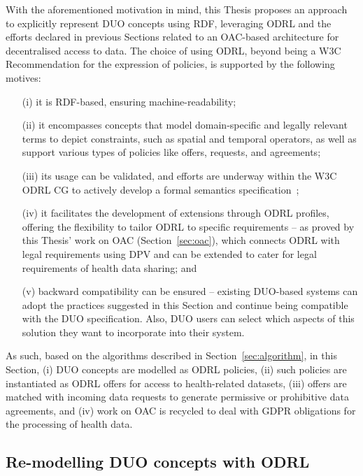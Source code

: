 With the aforementioned motivation in mind, this Thesis proposes an approach to explicitly represent DUO concepts using RDF, leveraging ODRL and the efforts declared in previous Sections related to an OAC-based architecture for decentralised access to data.
The choice of using ODRL, beyond being a W3C Recommendation for the expression of policies, is supported by the following motives:
\begin{enumerate}
    \item[(i)] it is RDF-based, ensuring machine-readability;
    \item[(ii)] it encompasses concepts that model domain-specific and legally relevant terms to depict constraints, such as spatial and temporal operators, as well as support various types of policies like offers, requests, and agreements; %
    \item[(iii)] its usage can be validated, and efforts are underway within the W3C ODRL CG to actively develop a formal semantics specification~\citep{fornara_odrl_2023};
    \item[(iv)] it facilitates the development of extensions through ODRL profiles, offering the flexibility to tailor ODRL to specific requirements -- as proved by this Thesis' work on OAC (Section~\ref{sec:oac}), which connects ODRL with legal requirements using DPV and can be extended to cater for legal requirements of health data sharing; and
    \item[(v)] backward compatibility can be ensured -- existing DUO-based systems can adopt the practices suggested in this Section and continue being compatible with the DUO specification. Also, DUO users can select which aspects of this solution they want to incorporate into their system.
\end{enumerate}

As such, based on the algorithms described in Section~\ref{sec:algorithm}, in this Section, (i) DUO concepts are modelled as ODRL policies, (ii) such policies are instantiated as ODRL offers for access to health-related datasets, (iii) offers are matched with incoming data requests to generate permissive or prohibitive data agreements, and (iv) work on OAC is recycled to deal with GDPR obligations for the processing of health data.

\subsection{Re-modelling DUO concepts with ODRL}
\label{sec:poc_duodrl}

